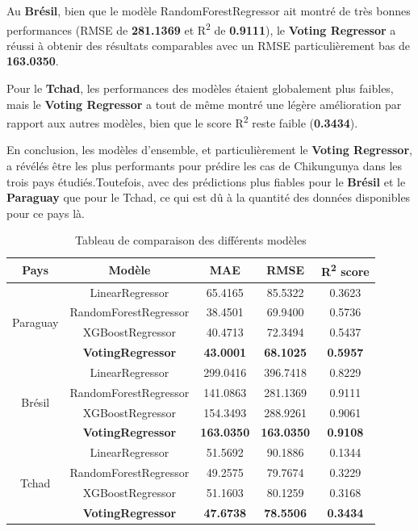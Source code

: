 Au \textbf{Brésil}, bien que le modèle RandomForestRegressor ait montré de très bonnes performances (RMSE de\textbf{ 281.1369} et R\textsuperscript{2} de \textbf{0.9111}), le \textbf{Voting Regressor} a réussi à obtenir des résultats comparables avec un RMSE particulièrement bas de \textbf{163.0350}.

Pour le \textbf{Tchad}, les performances des modèles étaient globalement plus faibles, mais le \textbf{Voting Regressor} a tout de même montré une légère amélioration par rapport aux autres modèles, bien que le score R\textsuperscript{2} reste faible (\textbf{0.3434}).

En conclusion, les modèles d'ensemble, et particulièrement le \textbf{Voting Regressor}, a révélés être les plus performants pour prédire les cas de Chikungunya dans les trois pays étudiés.Toutefois, avec des prédictions plus fiables pour le \textbf{Brésil} et le \textbf{Paraguay} que pour le Tchad, ce qui est dû à la quantité des données disponibles pour ce pays là.

\begin{table}[!hbt]
	\centering
	\caption{Tableau de comparaison des différents modèles}
	\label{tab:performance}
	\begin{tabular}{|c|c|c|c|c|}	
		
		\hline
		Pays & Modèle & MAE & RMSE & R\textsuperscript{2} score \\
		\hline
		\multirow{4}{*}{Paraguay} & LinearRegressor & 65.4165 & 85.5322 & 0.3623 \\
		\cline{2-5}
		& RandomForestRegressor & 38.4501 & 69.9400 & 0.5736 \\
		\cline{2-5}
		& XGBoostRegressor & 40.4713 & 72.3494 & 0.5437 \\
		\cline{2-5}
		& \textbf{VotingRegressor} & \textbf{43.0001} & \textbf{68.1025} & \textbf{0.5957} \\
		\hline
		\multirow{4}{*}{Brésil} & LinearRegressor & 299.0416 & 396.7418 & 0.8229 \\
		\cline{2-5}
		& RandomForestRegressor & 141.0863 & 281.1369 & 0.9111 \\
		\cline{2-5}
		& XGBoostRegressor & 154.3493 & 288.9261 & 0.9061\\
		\cline{2-5}
		& \textbf{VotingRegressor} & \textbf{163.0350}  & \textbf{163.0350} & \textbf{0.9108} \\
		\hline
		\multirow{4}{*}{Tchad} & LinearRegressor & 51.5692 & 90.1886 & 0.1344 \\
		\cline{2-5}
		& RandomForestRegressor & 49.2575 & 79.7674 & 0.3229 \\
		\cline{2-5}
		& XGBoostRegressor & 51.1603 & 80.1259 & 0.3168 \\
		\cline{2-5}
		& \textbf{VotingRegressor} & \textbf{47.6738} & \textbf{78.5506} & \textbf{0.3434} \\
		\hline
	\end{tabular}
\end{table}

